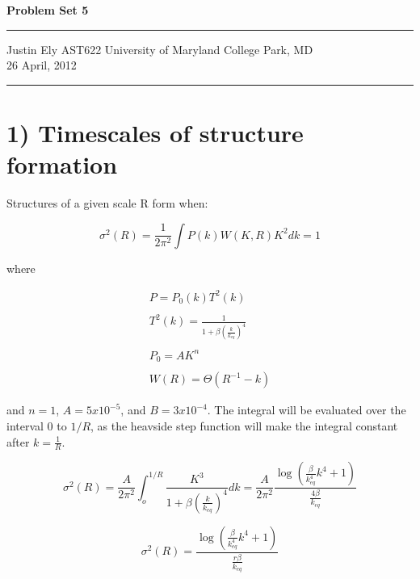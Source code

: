 \documentclass[a4paper,11pt]{article}
\begin{document}
\begin{flushright}

\vspace{1.1cm}

{\bf\Huge Problem Set 5}

\rule{0.25\linewidth}{0.5pt}

\vspace{0.5cm}
Justin Ely
\linebreak
\newline
\footnotesize{AST622 University of Maryland College Park, MD\\}
\vspace{0.5cm}
26 April, 2012
\end{flushright}

\noindent\rule{\linewidth}{1.0pt}
\section*{1) Timescales of structure formation}
Structures of a given scale R form when:

\begin{equation}
\sigma^2(R) = \frac{1}{2\pi^2}\int P(k)W(K,R)K^2dk = 1
\end{equation}

where

\begin{eqnarray}
P = P_0(k) T^2(k) \\
\nonumber \\ 
T^2(k) = \frac{1}{1+\beta(\frac{k}{k_{eq}})^4} \\
\nonumber \\
P_0 = AK^n \\
\nonumber \\
W(R) = \Theta(R^{-1}-k) 
\end{eqnarray}

and $n=1$, $A = 5x10^{-5}$, and $B = 3x10^{-4}.$  The integral will be evaluated over the interval 0 to $1/R$, as the heavside step function will make the integral constant after $k = \frac{1}{R}$.

\begin{equation}
\sigma^2(R) = \frac{A}{2\pi^2} \int _o^{1/R} \frac{K^3}{1+\beta(\frac{k}{k_{eq}})^4}  dk =  \frac{A}{2\pi^2} \frac{\log(\frac{\beta}{k_{eq}^4} k^4 +1)}{\frac{4\beta}{k_{eq}}} 
\end{equation}

\begin{equation}
\sigma^2(R) = \frac{\log(\frac{\beta}{k_{eq}^4} k^4 +1)}{\frac{r\beta}{k_{eq}}}
\end{equation}
\end{document}
